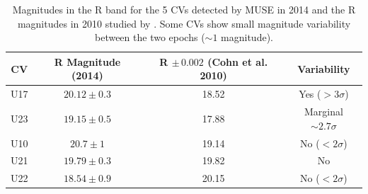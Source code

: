 
\begin{table}[]
\centering
\begin{tabular}{|c|c|c|c|}
\hline
\textbf{CV} & \textbf{R Magnitude (2014)} & \textbf{R $\mathbf{\pm \, 0.002}$ (Cohn et al. 2010)} & \textbf{Variability}\\ \hline
U17         & $20.12 \pm 0.3$                       & 18.52  & Yes ($> 3 \sigma$)\\ \hline
U23         & $19.15 \pm 0.5$                      & 17.88  & Marginal $\sim 2.7 \sigma$                    \\ \hline
U10         & $20.7 \pm 1 $                        & 19.14 & No ($< 2 \sigma$)          \\ \hline
U21         & $19.79 \pm 0.3$                   & 19.82 & No \\ \hline
U22         & $18.54 \pm 0.9 $                       & 20.15 & No ($< 2 \sigma$)                              \\ \hline

\end{tabular}
\caption[Magnitudes in the R band for 5 CVs detected with MUSE]{Magnitudes in the R band for the 5 CVs detected by MUSE in 2014 and the R magnitudes in 2010 studied by \cite{cohn_identification_2010}. Some CVs show small magnitude variability between the two epochs ($\sim 1$ magnitude).}
    \label{tab:truthTables}   
\end{table}

